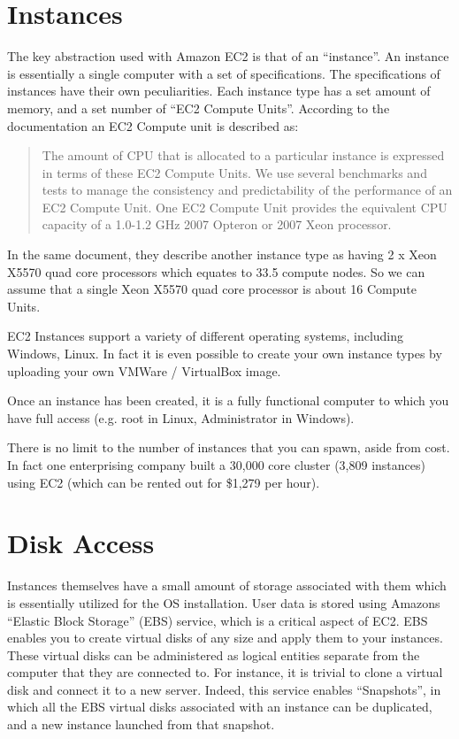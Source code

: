 \section{Instances}
The key abstraction used with Amazon EC2 is that of an ``instance''. An instance is essentially a single computer with a set of specifications. The specifications of instances have their own peculiarities. Each instance type has a set amount of memory, and a set number of ``EC2 Compute Units''. According to the documentation an EC2 Compute unit is described as:
\begin{quote}
The amount of CPU that is allocated to a particular instance is expressed in terms of these EC2 Compute Units. We use several benchmarks and tests to manage the consistency and predictability of the performance of an EC2 Compute Unit. One EC2 Compute Unit provides the equivalent CPU capacity of a 1.0-1.2 GHz 2007 Opteron or 2007 Xeon processor\ftAmThree\ftAmThreeText.
\end{quote}
In the same document, they describe another instance type as having 2 x Xeon X5570 quad core processors which equates to 33.5 compute nodes. So we can assume that a single Xeon X5570 quad core processor is about 16 Compute Units.

EC2 Instances support a variety of different operating systems, including Windows, Linux. In fact it is even possible to create your own instance types by uploading your own VMWare / VirtualBox image. 

Once an instance has been created, it is a fully functional computer to which you have full access (e.g. root in Linux, Administrator in Windows). 

There is no limit to the number of instances that you can spawn, aside from cost. In fact one enterprising company built a 30,000 core cluster (3,809 instances) using EC2 (which can be rented out for \$1,279 per hour)\ftAmFour\ftAmFourText.

\section{Disk Access}
Instances themselves have a small amount of storage associated with them which is essentially utilized for the OS installation. User data is stored using Amazons ``Elastic Block Storage'' (EBS) service, which is a critical aspect of EC2. EBS enables you to create virtual disks of any size and apply them to your instances. These virtual disks can be administered as logical entities separate from the computer that they are connected to. For instance, it is trivial to clone a virtual disk and connect it to a new server. Indeed, this service enables ``Snapshots'', in which all the EBS virtual disks associated with an instance can be duplicated, and a new instance launched from that snapshot.

